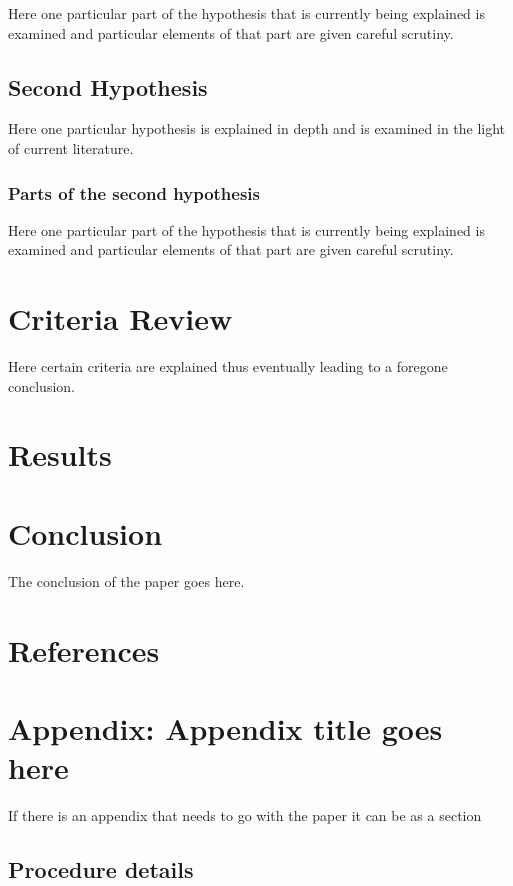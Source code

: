 \documentclass[
  12pt,
  notitlepage]{isuthesis}
\begin{document}
Here one particular part of the hypothesis that is
currently being explained is examined and particular
elements of that part are given careful scrutiny.

\subsection{Second Hypothesis}

Here one particular hypothesis is explained in depth
and is examined in the light of current literature.

\subsubsection{Parts of the second hypothesis}

Here one particular part of the hypothesis that is
currently being explained is examined and particular
elements of that part are given careful scrutiny.

\section{Criteria Review}

Here certain criteria are explained thus eventually
leading to a foregone conclusion.

\section{Results}

\section{Conclusion}\label{conclusion3}

The conclusion of the paper goes here.

\section{References}
\printbibliography[heading=none, section=5]

\section{Appendix: Appendix title goes here}

If there is an appendix that needs to go with the paper it can be as a section \cite{Aup91}

\subsection{Procedure details}
\end{document}
